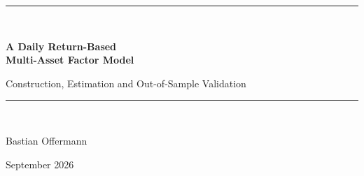 \documentclass[11pt,a4paper]{article}
\begin{document}
\begin{titlepage}
\thispagestyle{empty}
\vspace*{1.4cm}
{\raggedright
{\color{rule}\rule{\textwidth}{0.8pt}}\\[2.2ex]
{\sffamily\LARGE\bfseries\color{navy} A Daily Return-Based\\[0.5ex]
 Multi-Asset Factor Model\par}
\vspace{1.6ex}
{\sffamily\large\color{ink} Construction, Estimation and Out-of-Sample Validation\par}
\vspace{2.0ex}
{\color{rule}\rule{\textwidth}{0.8pt}}\\[3.0ex]
{\large Bastian Offermann\par}
\vspace{0.6ex}
{\small\color{ink} September 2026\par}
}

\vspace{1.6cm}


\end{titlepage}
\end{document}
